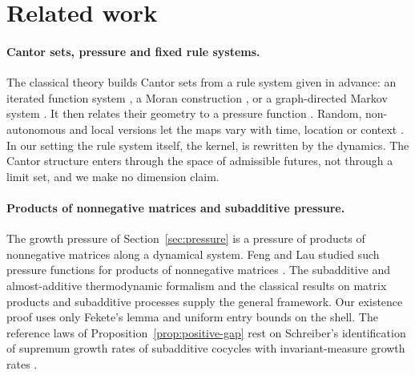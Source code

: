 \section{Related work}\label{sec:related-work}

\paragraph{Cantor sets, pressure and fixed rule systems.}
The classical theory builds Cantor sets from a rule system given in advance: an iterated function system \cite{Hutchinson1981Fractals}, a Moran construction \cite{Moran1946AdditiveFunctions}, or a graph-directed Markov system \cite{MauldinUrbanskiGDMS}. It then relates their geometry to a pressure function \cite{Bowen1979Quasicircles,Ruelle1978ThermodynamicFormalism,FalconerFractalGeometry}. Random, non-autonomous and local versions let the maps vary with time, location or context \cite{FalconerRandomFractals1986,BarnsleyDemkoEltonGeronimo1988,RempeGillenUrbanski2016NonAutonomousCIFS,OliveiraVarandasLocalIFS}. In our setting the rule system itself, the kernel, is rewritten by the dynamics. The Cantor structure enters through the space of admissible futures, not through a limit set, and we make no dimension claim.

\paragraph{Products of nonnegative matrices and subadditive pressure.}
The growth pressure of Section~\ref{sec:pressure} is a pressure of products of nonnegative matrices along a dynamical system. Feng and Lau studied such pressure functions for products of nonnegative matrices \cite{FengLau2002MatrixPressure}. The subadditive and almost-additive thermodynamic formalism \cite{BarreiraNonadditiveTF,CaoFengHuang2008SubAdditive,Mummert2006AlmostAdditive} and the classical results on matrix products and subadditive processes \cite{FurstenbergKesten1960RandomMatrices,Oseledets1968MET,Kingman1968Subadditive} supply the general framework. Our existence proof uses only Fekete's lemma \cite{Fekete1923DistributionRoots} and uniform entry bounds on the shell. The reference laws of Proposition~\ref{prop:positive-gap} rest on Schreiber's identification of supremum growth rates of subadditive cocycles with invariant-measure growth rates \cite{Schreiber1998Subadditive}.

